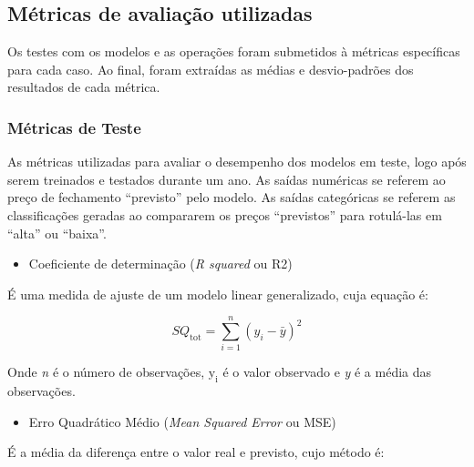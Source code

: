 \subsection{\textbf{Métricas de avaliação utilizadas}}


\par
Os testes com os modelos e as operações foram submetidos à métricas específicas para cada caso. Ao final, foram extraídas as médias e desvio-padrões dos resultados de cada métrica. 


\subsubsection{Métricas de Teste}


\par
As métricas utilizadas para avaliar o desempenho dos modelos em teste, logo após serem treinados e testados durante um ano. As saídas numéricas se referem ao preço de fechamento “previsto” pelo modelo. As saídas categóricas se referem as classificações geradas ao compararem os preços “previstos” para rotulá-las em “alta” ou “baixa”.




\begin{itemize}
\item{Coeficiente de determinação (\textit{R squared} ou R2)}
\end{itemize}

É uma medida de ajuste de um modelo linear generalizado, cuja equação é:

\begin{equation}
{\displaystyle SQ_{\text{tot}}=\sum _{i=1}^{n}(y_{i}-{\bar {y}})^{2}}
\end{equation}

Onde \textit{n} é o número de observações, $\mathrm{y_i}$ é o valor observado e \textit{y} é a média das observações.


\begin{itemize}
\item{Erro Quadrático Médio (\textit{Mean Squared Error} ou MSE)}
\end{itemize}

É a média da diferença entre o valor real e previsto, cujo método é:

